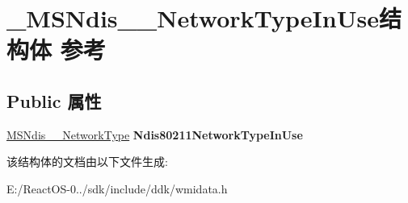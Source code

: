 \hypertarget{struct___m_s_ndis__80211___network_type_in_use}{}\section{\+\_\+\+M\+S\+Ndis\+\_\+\_\+\+Network\+Type\+In\+Use结构体 参考}
\label{struct___m_s_ndis__80211___network_type_in_use}
\subsection*{Public 属性}
\begin{DoxyCompactItemize}
\item 
\mbox{\label{struct___m_s_ndis__80211___network_type_in_use_adb226e183f7c037197a60440930b8ddb}} 
\hyperlink{struct___m_s_ndis__80211___network_type}{M\+S\+Ndis\+\_\+\_\+\+Network\+Type} {\bfseries Ndis80211\+Network\+Type\+In\+Use}
\end{DoxyCompactItemize}


该结构体的文档由以下文件生成\+:\begin{DoxyCompactItemize}
\item 
E\+:/\+React\+O\+S-\/0../sdk/include/ddk/wmidata.\+h\end{DoxyCompactItemize}
